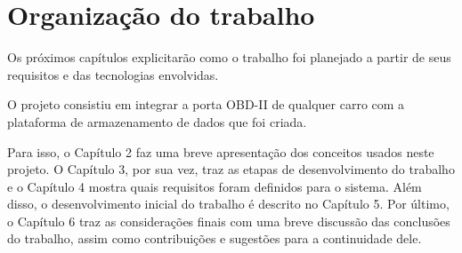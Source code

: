 \section{Organização do trabalho}
Os próximos capítulos explicitarão como o trabalho foi planejado a partir de seus requisitos e das tecnologias envolvidas.

O projeto consistiu em integrar a porta OBD-II de qualquer carro com a plataforma de armazenamento de dados que foi criada.

Para isso, o Capítulo 2 faz uma breve apresentação dos conceitos usados neste projeto. O Capítulo 3, por sua vez, traz as etapas de desenvolvimento do trabalho e o Capítulo 4 mostra quais requisitos foram definidos para o sistema. Além disso, o desenvolvimento inicial do trabalho é descrito no Capítulo 5. Por último, o Capítulo 6 traz as considerações finais com uma breve discussão das conclusões do trabalho, assim como contribuições e sugestões para a continuidade dele.